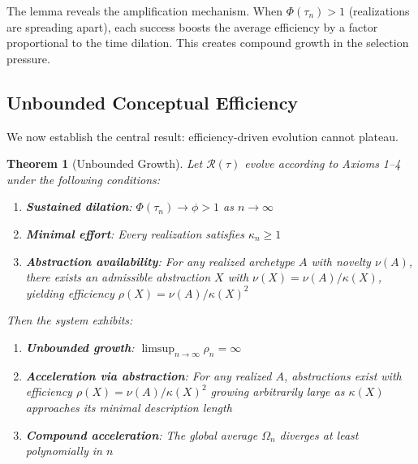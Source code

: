 \documentclass[11pt]{article}
\theoremstyle{definition}
\theoremstyle{plain}
\newtheorem{theorem}{Theorem}
\theoremstyle{remark}
\begin{document}
The lemma reveals the amplification mechanism. When $\Phi(\tau_n) > 1$ (realizations are spreading apart), each success boosts the average efficiency by a factor proportional to the time dilation. This creates compound growth in the selection pressure.

\subsection{Unbounded Conceptual Efficiency}

We now establish the central result: efficiency-driven evolution cannot plateau.

\begin{theorem}[Unbounded Growth]\label{thm:unbounded}
Let $\mathcal{R}(\tau)$ evolve according to Axioms 1--4 under the following conditions:
\begin{enumerate}[label=(\roman*)]
\item \textbf{Sustained dilation}: $\Phi(\tau_n) \to \phi > 1$ as $n \to \infty$
\item \textbf{Minimal effort}: Every realization satisfies $\kappa_n \geq 1$
\item \textbf{Abstraction availability}: For any realized archetype $A$ with novelty $\nu(A)$, there exists an admissible abstraction $X$ with $\nu(X) = \nu(A)/\kappa(X)$, yielding efficiency $\rho(X) = \nu(A)/\kappa(X)^2$
\end{enumerate}
Then the system exhibits:
\begin{enumerate}
\item \textbf{Unbounded growth}: $\limsup_{n\to\infty} \rho_n = \infty$
\item \textbf{Acceleration via abstraction}: For any realized $A$, abstractions exist with efficiency $\rho(X) = \nu(A)/\kappa(X)^2$ growing arbitrarily large as $\kappa(X)$ approaches its minimal description length
\item \textbf{Compound acceleration}: The global average $\Omega_n$ diverges at least polynomially in $n$
\end{enumerate}
\end{theorem}
\end{document}
